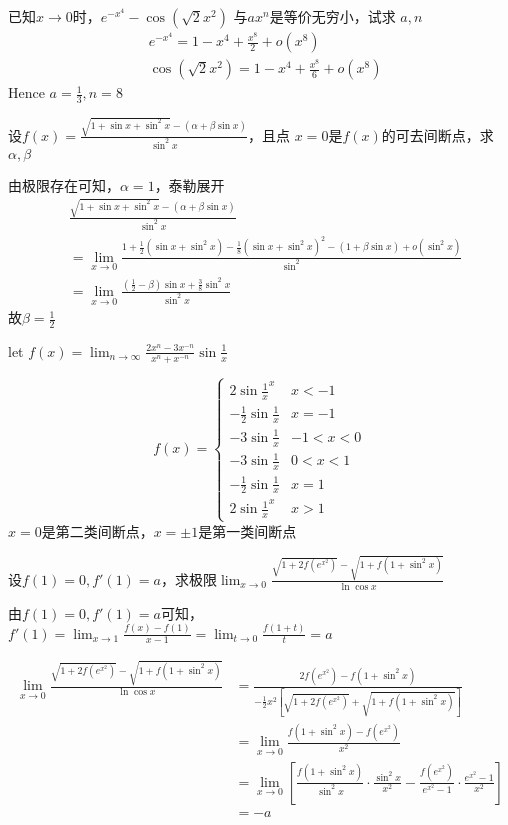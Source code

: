 \documentclass{article}
\begin{document}
\begin{examplle}[]
已知\(x\to0\)时，\(e^{-x^4}-\cos(\sqrt{2}x^2)\) 与\(ax^n\)是等价无穷小，试求
\(a,n\)
\begin{align*}
&e^{-x^4}=1-x^4+\frac{x^8}{2}+o(x^8)\\
&\cos(\sqrt{2}x^2)=1-x^4+\frac{x^8}{6}+o(x^8)
\end{align*}
Hence \(a=\frac{1}{3},n=8\)
\end{examplle}

\begin{examplle}[]
设\(\displaystyle f(x)=\frac{\sqrt{1+\sin x+\sin^2x}-(\alpha+\beta\sin x)}{\sin^2x}\)，且点
\(x=0\)是\(f(x)\)的可去间断点，求\(\alpha,\beta\)

由极限存在可知，\(\alpha=1\)，泰勒展开
\begin{align*}
&\frac{\sqrt{1+\sin x+\sin^2x}-(\alpha+\beta\sin x)}{\sin^2x}\\
&=\lim_{x\to0}\frac{1+\frac{1}{2}(\sin x+\sin^2x)-\frac{1}{8}(\sin x+\sin^2x)^2-(1+\beta\sin x)
+o(\sin^2x)}{\sin^2}\\
&=\lim_{x\to0}\frac{(\frac{1}{2}-\beta)\sin x+\frac{3}{8}\sin^2x}{\sin^2x}
\end{align*}
故\(\beta=\frac{1}{2}\)
\end{examplle}

\begin{examplle}[]
let \(\displaystyle f(x)=\lim_{n\to\infty}\frac{2x^n-3x^{-n}}{x^n+x^{-n}}\sin\frac{1}{x}\)

\begin{equation*}
f(x)=
\begin{cases}
2\sin\frac{1}{x}^x&x<-1\\
-\frac{1}{2}\sin\frac{1}{x}&x=-1\\
-3\sin\frac{1}{x}&-1<x<0\\
-3\sin\frac{1}{x}&0<x<1\\
-\frac{1}{2}\sin\frac{1}{x}&x=1\\
2\sin\frac{1}{x}^x&x>1
\end{cases}
\end{equation*}
\(x=0\)是第二类间断点，\(x=\pm1\)是第一类间断点
\end{examplle}

\begin{examplle}[]
设\(f(1)=0,f'(1)=a\)，求极限\(\displaystyle
  \lim_{x\to0}\frac{\sqrt{1+2f(e^{x^2})}- \sqrt{1+f(1+\sin^2 x)}}{\ln\cos x}\)

由\(f(1)=0,f'(1)=a\)可知，\(\displaystyle
  f'(1)=\lim_{x\to1}\frac{f(x)-f(1)}{x-1}=\lim_{t\to0}\frac{f(1+t)}{t}=a\)

\begin{align*}
\lim_{x\to0}\frac{\sqrt{1+2f(e^{x^2})}- \sqrt{1+f(1+\sin^2 x)}}{\ln\cos x}&=
\frac{2f(e^{x^2})-f(1+\sin^2x)}{-\frac{1}{2}x^2
\left[\sqrt{1+2f(e^{x^2})}+\sqrt{1+f(1+\sin^2x)}
\right]}\\
&=\lim_{x\to0}\frac{f(1+\sin^2x)-f(e^{x^2})}{x^2}\\
&=\lim_{x\to0}\left[
\frac{f(1+\sin^2x)}{\sin^2x}\cdot\frac{\sin^2x}{x^2}-
\frac{f(e^{x^2})}{e^{x^2}-1}\cdot\frac{e^{x^2}-1}{x^2}
\right]\\
&=-a
\end{align*}
\end{examplle}
\end{document}

